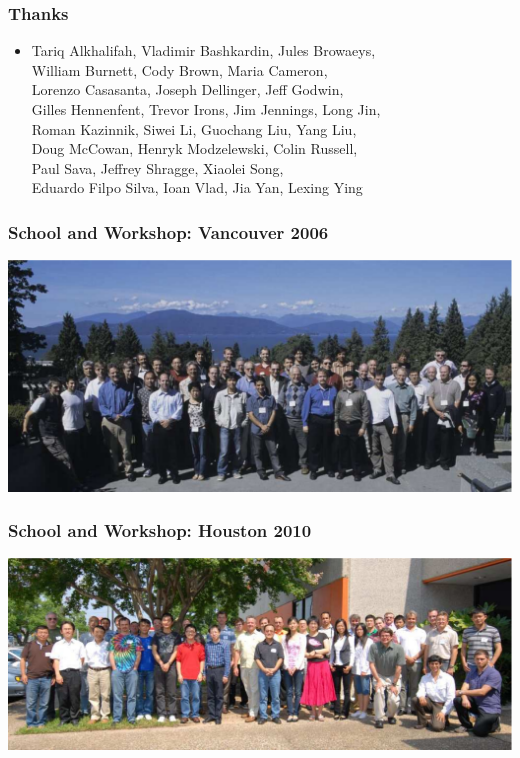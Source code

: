 \begin{frame}
\MadLogo
\frametitle{Thanks}

\begin{itemize}
\item Tariq Alkhalifah, Vladimir Bashkardin, Jules Browaeys, \\
William Burnett, Cody Brown, Maria Cameron, \\
Lorenzo Casasanta, Joseph Dellinger, Jeff Godwin, \\
Gilles Hennenfent, Trevor Irons, Jim Jennings, Long Jin, \\
Roman Kazinnik, Siwei Li, Guochang Liu, Yang Liu, \\
Doug McCowan, Henryk Modzelewski, Colin Russell, \\
Paul Sava, Jeffrey Shragge, Xiaolei Song, \\
Eduardo Filpo Silva, Ioan Vlad, Jia Yan, Lexing Ying
\end{itemize}
\end{frame}



\begin{frame}
  \frametitle{School and Workshop: Vancouver 2006}
  \includegraphics[width=\textwidth]{Fig/RSF2006}
\end{frame}

\begin{frame}
  \frametitle{School and  Workshop: Houston 2010}
  \includegraphics[width=\textwidth]{Fig/RSF2010}
\end{frame}

